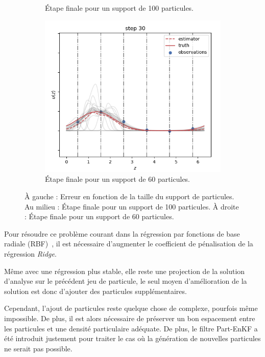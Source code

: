 \begin{figure}
\begin{subfigure}{0.29\textwidth}
        \caption{Étape finale pour un support de 100 particules.}
        \label{fig:error_support2}
    \end{subfigure}
    \hfill
    \begin{subfigure}{0.29\textwidth}
        \includegraphics[width=\textwidth]{images/app1d/error_support/not_ok.png}
        \caption{Étape finale pour un support de 60 particules.}
        \label{fig:error_support3}
    \end{subfigure}
    \caption{À gauche : Erreur en fonction de la taille du support de particules. Au milieu : Étape finale pour un support de 100 particules. À droite : Étape finale pour un support de 60 particules.}
    \label{fig:error_support}
\end{figure}

Pour résoudre ce problème courant dans la régression par fonctions de base radiale (RBF)~\cite{fornberg_flyer_2015}, il est nécessaire d'augmenter le coefficient de pénalisation de la régression \textit{Ridge}.

Même avec une régression plus stable, elle reste une projection de la solution d'analyse sur le précédent jeu de particule, le seul moyen d'amélioration de la solution est donc d'ajouter des particules supplémentaires.

Cependant, l'ajout de particules reste quelque chose de complexe, pourfois même impossible. De plus, il est alors nécessaire de préserver un bon espacement entre les particules et une densité particulaire adéquate. De plus, le filtre Part-EnKF a été introduit justement pour traiter le cas où la génération de nouvelles particules ne serait pas possible.

